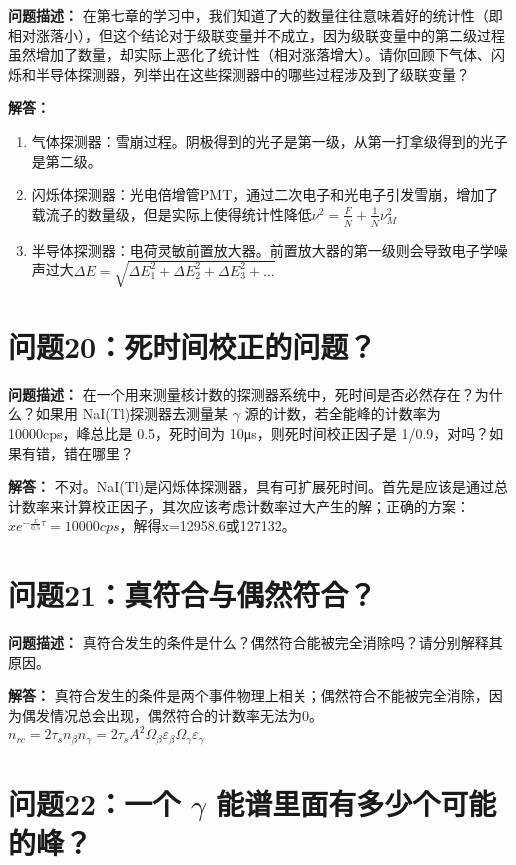 \documentclass{article}
\begin{document}
\textbf{问题描述：} 在第七章的学习中，我们知道了大的数量往往意味着好的统计性（即相对涨落小），但这个结论对于级联变量并不成立，因为级联变量中的第二级过程虽然增加了数量，却实际上恶化了统计性（相对涨落增大）。请你回顾下气体、闪烁和半导体探测器，列举出在这些探测器中的哪些过程涉及到了级联变量？

\textbf{解答：}

\begin{enumerate}
    \item 气体探测器：雪崩过程。阴极得到的光子是第一级，从第一打拿级得到的光子是第二级。
    \item 闪烁体探测器：光电倍增管PMT，通过二次电子和光电子引发雪崩，增加了载流子的数量级，但是实际上使得统计性降低$\nu^2=\frac{F}{\overline{N}}+\frac{1}{\overline{N}}\nu_M^2$
    \item 半导体探测器：电荷灵敏前置放大器。前置放大器的第一级则会导致电子学噪声过大$\Delta E=\sqrt{\Delta E_1^2+\Delta E_2^2+\Delta E_3^2+\dots}$
\end{enumerate}

\section{问题20：死时间校正的问题？}
\label{sec:prob20}

\textbf{问题描述：} 在一个用来测量核计数的探测器系统中，死时间是否必然存在？为什么？如果用 NaI(Tl)探测器去测量某 $\gamma$ 源的计数，若全能峰的计数率为 10000cps，峰总比是 0.5，死时间为 10μs，则死时间校正因子是 1/0.9，对吗？如果有错，错在哪里？

\textbf{解答：} 不对。NaI(Tl)是闪烁体探测器，具有可扩展死时间。首先是应该是通过总计数率来计算校正因子，其次应该考虑计数率过大产生的解；正确的方案：$x e^{-\frac{x}{0.5}\tau}=10000cps$，解得x=12958.6或127132。

\section{问题21：真符合与偶然符合？}
\label{sec:prob21}

\textbf{问题描述：} 真符合发生的条件是什么？偶然符合能被完全消除吗？请分别解释其原因。

\textbf{解答：} 真符合发生的条件是两个事件物理上相关；偶然符合不能被完全消除，因为偶发情况总会出现，偶然符合的计数率无法为0。$n_{rc}=2\tau_sn_{\beta}n_{\gamma} = 2\tau_sA^2\Omega_{\beta}\varepsilon_{\beta}\Omega_{\gamma}\varepsilon_{\gamma}$

\section{问题22：一个 $\gamma$ 能谱里面有多少个可能的峰？}
\label{sec:prob22}
\end{document}
